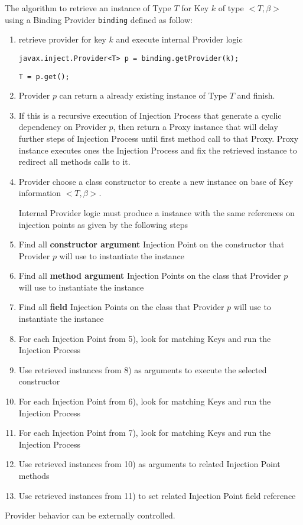 \begin{defi}
  The algorithm to retrieve an instance of Type $T$ for Key $k$ of type $<T,\beta>$ using a Binding Provider \lstinline|binding| defined as follow:
  \begin{enumerate}
   \item retrieve provider for key $k$ and execute internal Provider logic

  \lstinline|javax.inject.Provider<T> p = binding.getProvider(k);|

  \lstinline|T = p.get();|

   \item Provider $p$ can return a already existing instance of Type $T$ and finish.
   \item If this is a recursive execution of Injection Process that generate a cyclic dependency on Provider $p$, then return a Proxy instance that will delay further steps of Injection Process until first method call to that Proxy. Proxy instance executes ones the Injection Process and fix the retrieved instance to redirect all methods calls to it.
   
  \item Provider choose a class constructor to create a new instance on base of Key information $<T,\beta>$.
  
Internal Provider logic must produce a instance with the same references on injection points as given by the following steps

   \item Find all \textbf{constructor argument} Injection Point on the constructor that Provider $p$ will use to instantiate the instance
   \item Find all \textbf{method argument} Injection Points on the class that Provider $p$ will use to instantiate the instance
   \item Find all \textbf{field} Injection Points on the class that Provider $p$ will use to instantiate the instance
   \item For each Injection Point from 5), look for matching Keys and run the Injection Process
   \item Use retrieved instances from 8) as arguments to execute the selected constructor
   \item For each Injection Point from 6), look for matching Keys and run the Injection Process
   \item For each Injection Point from 7), look for matching Keys and run the Injection Process
   \item Use retrieved instances from 10) as arguments to related Injection Point methods
   \item Use retrieved instances from 11) to set related Injection Point field reference
  \end{enumerate}

Provider behavior can be externally controlled.
\end{defi}


